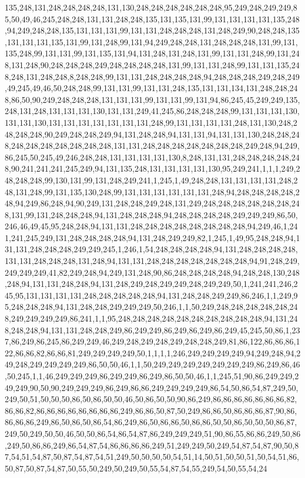 135,248,131,248,248,248,248,131,130,248,248,248,248,248,248,95,249,248,249,249,85,50,49,46,245,248,248,131,131,248,248,135,131,135,131,99,131,131,131,131,135,248,94,249,248,248,135,131,131,131,99,131,131,248,248,248,131,248,249,90,248,248,135,131,131,131,135,131,99,131,248,99,131,94,249,248,248,131,248,248,248,131,99,131,135,248,99,131,131,99,131,135,131,94,131,248,131,248,131,99,131,131,248,99,131,248,131,248,90,248,248,248,249,248,248,248,248,131,99,131,131,248,99,131,131,135,248,248,131,248,248,8,248,248,99,131,131,248,248,248,248,94,248,248,248,249,248,249,49,245,49,46,50,248,248,99,131,131,99,131,131,248,135,131,131,134,131,248,248,248,86,50,90,249,248,248,248,131,131,131,99,131,131,99,131,94,86,245,45,249,249,135,248,131,248,131,131,131,130,131,131,249,41,245,86,248,248,248,99,131,131,131,130,131,131,130,131,131,131,131,131,131,131,248,99,131,131,131,131,248,131,130,248,248,248,248,90,249,248,248,249,94,131,248,248,94,131,131,94,131,131,130,248,248,248,248,248,248,248,248,248,248,131,131,248,248,248,248,248,248,248,249,248,94,249,86,245,50,245,49,246,248,248,131,131,131,131,130,8,248,131,131,248,248,248,248,248,90,241,241,241,245,249,94,131,135,248,131,131,131,131,130,95,249,241,1,1,1,249,248,248,248,99,130,131,99,131,248,249,241,1,245,1,49,248,248,131,131,131,131,248,248,131,248,99,131,135,130,248,99,131,131,131,131,131,131,248,94,248,248,248,248,248,94,249,86,248,94,90,249,131,248,248,249,248,131,249,248,248,248,248,248,248,248,131,99,131,248,248,248,94,131,248,248,248,94,248,248,248,248,249,249,249,86,50,246,46,49,45,95,248,248,94,131,131,248,248,248,248,248,248,248,248,94,249,46,1,241,241,245,249,131,248,248,248,248,94,131,248,249,249,82,1,245,1,49,95,248,248,94,131,131,248,248,248,249,249,245,1,246,1,54,248,248,248,248,94,131,248,248,248,248,131,131,248,248,248,131,248,94,131,131,248,248,248,248,248,248,248,94,91,248,249,249,249,249,41,82,249,248,94,249,131,248,90,86,248,248,248,248,94,248,248,130,248,248,94,131,131,248,248,94,131,248,249,248,249,249,248,249,249,50,1,241,241,246,245,95,131,131,131,131,248,248,248,248,248,94,131,248,248,249,249,86,246,1,1,249,95,248,248,248,94,131,248,248,249,249,249,50,246,1,1,50,249,248,248,248,248,248,248,249,249,249,249,86,241,1,1,95,248,248,248,248,248,248,248,248,248,248,94,131,248,248,248,94,131,131,248,248,249,86,249,249,86,249,86,249,86,249,45,245,50,86,1,237,86,249,86,245,86,249,249,46,249,248,249,248,249,248,248,249,81,86,122,86,86,86,122,86,86,82,86,86,81,249,249,249,249,50,1,1,1,1,246,249,249,249,249,94,249,248,94,249,248,249,249,249,249,86,50,50,46,1,1,50,249,249,249,249,249,249,249,86,249,86,46,50,245,1,1,46,249,249,249,86,249,249,86,249,86,50,50,46,1,1,245,51,90,86,249,249,249,249,90,50,90,249,249,249,86,249,86,86,249,249,249,249,86,54,50,86,54,87,249,50,249,50,51,50,50,50,86,50,86,50,50,46,50,86,50,50,90,86,249,86,86,86,86,86,86,86,82,86,86,82,86,86,86,86,86,86,86,86,249,86,86,50,87,50,249,86,86,50,86,86,86,87,90,86,86,86,86,249,86,50,86,50,86,54,86,249,86,50,86,86,50,86,86,50,50,86,50,50,50,86,87,249,50,249,50,50,46,50,50,86,54,86,54,87,86,249,249,249,51,90,86,55,86,86,249,50,86,249,50,86,86,249,86,54,87,54,86,86,86,86,249,51,249,249,50,249,54,87,54,87,90,50,87,54,51,54,87,50,87,54,87,54,51,249,50,50,50,50,54,51,14,50,51,50,50,51,50,54,51,86,50,87,50,87,54,87,50,55,50,249,50,249,50,55,54,87,54,55,249,54,50,55,54,24